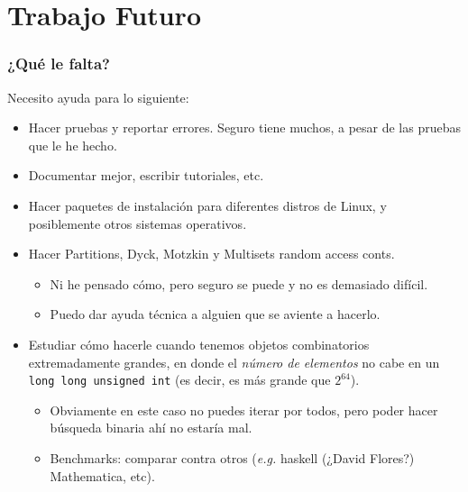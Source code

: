 \documentclass[spanish,professionalfonts]{beamer}
\def\tcb#1{\textcolor{MyBlue}{#1}}
\begin{document}
\section{Trabajo Futuro}
\begin{frame}\frametitle{¿Qué le falta?} \pause
 Necesito ayuda para lo siguiente: \pause
 \begin{itemize} 
  \item Hacer pruebas y reportar errores. Seguro tiene muchos, a pesar de las pruebas que le he hecho. \pause
  \item Documentar mejor, escribir tutoriales, etc.\pause
  \item Hacer paquetes de instalación para diferentes distros de Linux, y posiblemente otros sistemas operativos. \pause
  \item Hacer Partitions, Dyck, Motzkin y Multisets random access conts. \pause
  \begin{itemize}
    \item Ni he pensado cómo, pero seguro se puede y no es demasiado difícil. \pause
    \item Puedo dar ayuda técnica a alguien que se aviente a hacerlo. \pause
  \end{itemize}
  \item Estudiar cómo hacerle cuando tenemos objetos combinatorios extremadamente grandes, en donde el \textit{número de elementos} no cabe en un \tcb{\texttt{long long unsigned int}} (es decir, es más grande que $2^{64}$). \pause
  \begin{itemize}
    \item Obviamente en este caso no puedes iterar por todos, pero poder hacer búsqueda binaria ahí no estaría mal. \pause
  \item \tcb{Benchmarks}: comparar contra otros (\emph{e.g.} haskell (¿David Flores?) Mathematica, etc).
  \end{itemize}
 \end{itemize}
\end{frame}
\end{document}
